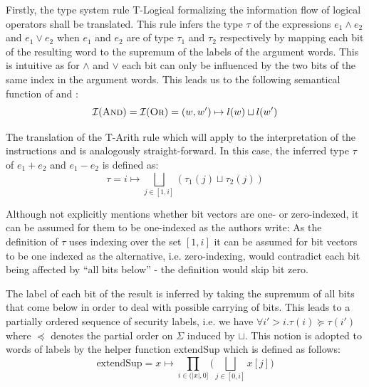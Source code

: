 Firstly, the type system rule T-Logical formalizing the information flow of logical operators shall be translated.
This rule infers the type $ \tau $ of the expressions $ e_1 \land e_2 $ and $ e_1 \lor e_2 $ when $ e_1 $ and $ e_2 $ are of type $ \tau_1 $ and $ \tau_2 $ respectively by mapping each bit of the resulting word to the supremum of the labels of the argument words.
This is intuitive as for $ \land $ and $ \lor $ each bit can only be influenced by the two bits of the same index in the argument words.
This leads us to the following semantical function of  and :
\begin{equation*}
    \mathcal{I}(\textsc{And}) = \mathcal{I}(\textsc{Or}) = (w, w') \mapsto l(w) \sqcup l(w')
\end{equation*}

The translation of the T-Arith rule which will apply to the interpretation of the instructions  and  is analogously straight-forward.
In this case, the inferred type $ \tau $ of $ e_1 + e_2 $ and $ e_1 - e_2 $ is defined as:
\begin{equation*}
    \tau = i \mapsto \bigsqcup_{j \in [1, i]} (\tau_1(j) \sqcup \tau_2(j))
\end{equation*}

Although \cite{Ferraiuolo17} not explicitly mentions whether bit vectors are one- or zero-indexed, it can be assumed for them to be one-indexed as the authors write: 
As the definition of $ \tau $ uses indexing over the set $ [ 1, i ] $ it can be assumed for bit vectors to be one indexed as the alternative, i.e. zero-indexing, would contradict each bit being affected by \enquote{all bits below} - the definition would skip bit zero.

The label of each bit of the result is inferred by taking the supremum of all bits that come below in order to deal with possible carrying of bits.
This leads to a partially ordered sequence of security labels, i.e. we have $ \forall i' > i. \tau(i) \succeq \tau(i') $ where $ \preceq $ denotes the partial order on $ \Sigma $ induced by $ \sqcup $.
This notion is adopted to words of labels by the helper function extendSup which is defined as follows:
\begin{equation*}
    \text{extendSup} = x \mapsto \prod_{i \in (|x|, 0]} \Big( \bigsqcup_{j \in [0, i]} x[j] \Big)
\end{equation*}

